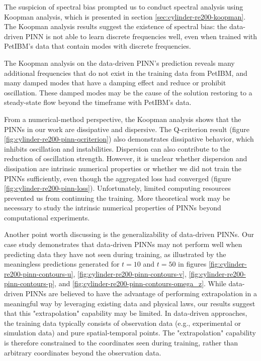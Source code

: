 The suspicion of spectral bias prompted us to conduct spectral analysis using Koopman analysis, which is presented in section \ref{sec:cylinder-re200-koopman}.
The Koopman analysis results suggest the existence of spectral bias: the data-driven PINN is not able to learn discrete frequencies well, even when trained with PetIBM's data that contain modes with discrete frequencies.

The Koopman analysis on the data-driven PINN's prediction reveals many additional frequencies that do not exist in the training data from PetIBM, and many damped modes that have a damping effect and reduce or prohibit oscillation.
These damped modes may be the cause of the solution restoring to a steady-state flow beyond the timeframe with PetIBM's data.

From a numerical-method perspective, the Koopman analysis shows that the PINNs in our work are dissipative and dispersive.
The Q-criterion result (figure \ref{fig:cylinder-re200-pinn-qcriterion}) also demonstrates dissipative behavior, which inhibits oscillation and instabilities.
Dispersion can also contribute to the reduction of oscillation strength.
However, it is unclear whether dispersion and dissipation are intrinsic numerical properties or whether we did not train the PINNs sufficiently, even though the aggregated loss had converged (figure \ref{fig:cylinder-re200-pinn-loss}).
Unfortunately, limited computing resources prevented us from continuing the training.
More theoretical work may be necessary to study the intrinsic numerical properties of PINNs beyond computational experiments.

Another point worth discussing is the generalizability of data-driven PINNs.
Our case study demonstrates that data-driven PINNs may not perform well when predicting data they have not seen during training, as illustrated by the meaningless predictions generated for $t = 10$ and $t = 50$ in figures \ref{fig:cylinder-re200-pinn-contours-u}, \ref{fig:cylinder-re200-pinn-contours-v}, \ref{fig:cylinder-re200-pinn-contours-p}, and \ref{fig:cylinder-re200-pinn-contours-omega_z}.
While data-driven PINNs are believed to have the advantage of performing extrapolation in a meaningful way by leveraging existing data and physical laws, our results suggest that this "extrapolation" capability may be limited.
In data-driven approaches, the training data typically consists of observation data (e.g., experimental or simulation data) and pure spatial-temporal points.
The "extrapolation" capability is therefore constrained to the coordinates seen during training, rather than arbitrary coordinates beyond the observation data.

